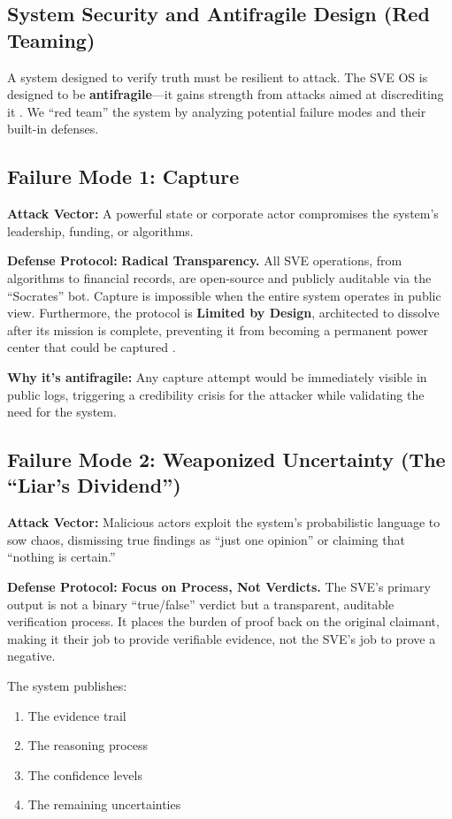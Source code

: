 \documentclass[11pt,a4paper]{article}
\begin{document}
\begin{small}
\section{System Security and Antifragile Design (Red Teaming)}
A system designed to verify truth must be resilient to attack. The SVE OS is designed to be \textbf{antifragile}—it gains strength from attacks aimed at discrediting it \citep{Taleb2012}. We ``red team'' the system by analyzing potential failure modes and their built-in defenses.

\subsection{Failure Mode 1: Capture}
\textbf{Attack Vector:} A powerful state or corporate actor compromises the system's leadership, funding, or algorithms.

\textbf{Defense Protocol:} \textbf{Radical Transparency.} All SVE operations, from algorithms to financial records, are open-source and publicly auditable via the ``Socrates'' bot. Capture is impossible when the entire system operates in public view. Furthermore, the protocol is \textbf{Limited by Design}, architected to dissolve after its mission is complete, preventing it from becoming a permanent power center that could be captured \citep[lines 1916--1920, 3497--3498]{AnalyticalReport2025}.

\textbf{Why it's antifragile:} Any capture attempt would be immediately visible in public logs, triggering a credibility crisis for the attacker while validating the need for the system.

\subsection{Failure Mode 2: Weaponized Uncertainty (The ``Liar's Dividend'')}
\textbf{Attack Vector:} Malicious actors exploit the system's probabilistic language to sow chaos, dismissing true findings as ``just one opinion'' or claiming that ``nothing is certain.''

\textbf{Defense Protocol:} \textbf{Focus on Process, Not Verdicts.} The SVE's primary output is not a binary ``true/false'' verdict but a transparent, auditable verification process. It places the burden of proof back on the original claimant, making it their job to provide verifiable evidence, not the SVE's job to prove a negative.

The system publishes:
\begin{enumerate}[nosep]
    \item The evidence trail
    \item The reasoning process
    \item The confidence levels
    \item The remaining uncertainties
\end{enumerate}


\end{small}
\end{document}
